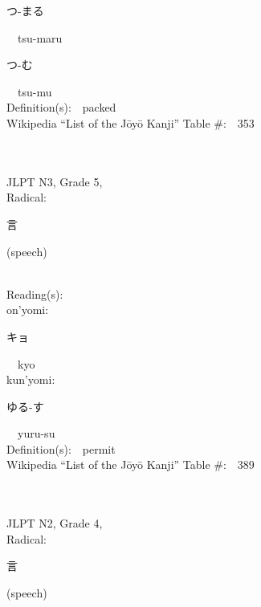 \begin{multicols}{2}
{\hspace*{2em}}{\begin{CJK}{UTF8}{min} つ-まる \end{CJK}}\ \ tsu-maru\ \ \\
{\hspace*{2em}}{\begin{CJK}{UTF8}{min} つ-む \end{CJK}}\ \ tsu-mu\ \ \\
Definition(s):\ \ packed \\
Wikipedia ``List of the J\=oy\=o Kanji'' Table \#:\ \ 353 \\
\ \ \\
{\fontsize{34pt}{40pt}  }\ \ \\  %
{JLPT N3, Grade 5, \\Radical:\ \ {\begin{CJK}{UTF8}{min} 言 \end{CJK}} (speech) } \\
Reading(s):\ \ \\
{\hspace*{1em}}on'yomi:\ \ \\
{\hspace*{2em}}{\begin{CJK}{UTF8}{min} キョ \end{CJK}}\ \ kyo\ \ \\
{\hspace*{1em}}kun'yomi:\ \ \\
{\hspace*{2em}}{\begin{CJK}{UTF8}{min} ゆる-す \end{CJK}}\ \ yuru-su\ \ \\
Definition(s):\ \ permit \\
Wikipedia ``List of the J\=oy\=o Kanji'' Table \#:\ \ 389 \\
\ \ \\
{\fontsize{34pt}{40pt}  }\ \ \\  %
{JLPT N2, Grade 4, \\Radical:\ \ {\begin{CJK}{UTF8}{min} 言 \end{CJK}} (speech) } \\

\end{multicols}
